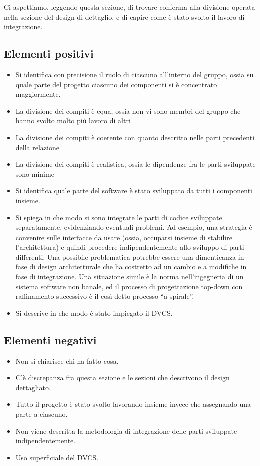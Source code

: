 \documentclass[a4paper,12pt]{report}
\begin{document}
Ci aspettiamo, leggendo questa sezione, di trovare conferma alla divisione operata nella sezione del design di dettaglio, e di capire come è stato svolto il lavoro di integrazione.

\subsection*{Elementi positivi}

\begin{itemize}
	\item Si identifica con precisione il ruolo di ciascuno all'interno del gruppo, ossia su quale parte del progetto ciascuno dei componenti si è concentrato maggiormente.
	\item La divisione dei compiti è equa, ossia non vi sono membri del gruppo che hanno svolto molto più lavoro di altri
	\item La divisione dei compiti è coerente con quanto descritto nelle parti precedenti della relazione
	\item La divisione dei compiti è realistica, ossia le dipendenze fra le parti sviluppate sono minime
	\item Si identifica quale parte del software è stato sviluppato da tutti i componenti insieme.
	\item Si spiega in che modo si sono integrate le parti di codice sviluppate separatamente, evidenziando eventuali problemi. Ad esempio, una strategia è convenire sulle interfacce da usare (ossia, occuparsi insieme di stabilire l'architettura) e quindi procedere indipendentemente allo sviluppo di parti differenti. Una possibile problematica potrebbe essere una dimenticanza in fase di design architetturale che ha costretto ad un cambio e a modifiche in fase di integrazione. Una situazione simile è la norma nell'ingegneria di un sistema software non banale, ed il processo di progettazione top-down con raffinamento successivo è il così detto processo ``a spirale''.
	\item Si descrive in che modo è stato impiegato il DVCS.
\end{itemize}

\subsection*{Elementi negativi}
\begin{itemize}
	\item Non si chiarisce chi ha fatto cosa.
	\item C'è discrepanza fra questa sezione e le sezioni che descrivono il design dettagliato.
	\item Tutto il progetto è stato svolto lavorando insieme invece che assegnando una parte a ciascuno.
	\item Non viene descritta la metodologia di integrazione delle parti sviluppate indipendentemente.
	\item Uso superficiale del DVCS.
\end{itemize}
\end{document}
